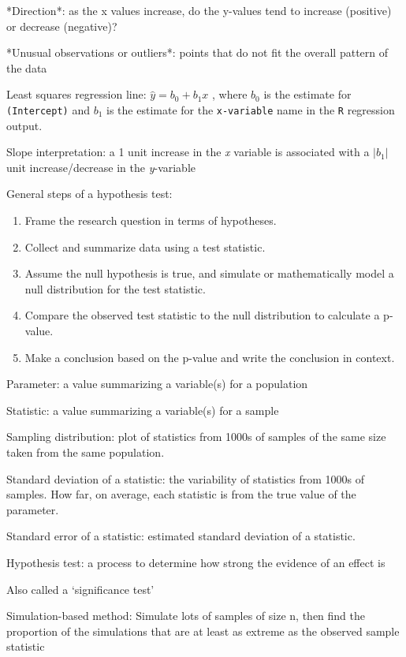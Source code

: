 \documentclass[
]{report}
\newcommand{\rgi}{\hspace{24pt}}  %
\begin{document}
\rgi *Direction*: as the x values increase, do the y-values tend to increase (positive) or decrease (negative)?

\rgi *Unusual observations or outliers*: points that do not fit the overall pattern of the data

Least squares regression line: \(\hat{y} = b_0+b_1x\) , where \(b_0\) is the estimate for \texttt{(Intercept)} and \(b_1\) is the estimate for the \texttt{x-variable} name in the \texttt{R} regression output.

Slope interpretation: a 1 unit increase in the \emph{x} variable is associated with a \(|b_1 |\) unit increase/decrease in the \emph{y}-variable

General steps of a hypothesis test:

\begin{enumerate}
\def\labelenumi{\arabic{enumi}.}
\item
  Frame the research question in terms of hypotheses.
\item
  Collect and summarize data using a test statistic.
\item
  Assume the null hypothesis is true, and simulate or mathematically model a null distribution for the test statistic.
\item
  Compare the observed test statistic to the null distribution to calculate a p-value.
\item
  Make a conclusion based on the p-value and write the conclusion in context.
\end{enumerate}

Parameter: a value summarizing a variable(s) for a population

Statistic: a value summarizing a variable(s) for a sample

Sampling distribution: plot of statistics from 1000s of samples of the same size taken from the same population.

Standard deviation of a statistic: the variability of statistics from 1000s of samples. How far, on average, each statistic is from the true value of the parameter.

Standard error of a statistic: estimated standard deviation of a statistic.

Hypothesis test: a process to determine how strong the evidence of an effect is

\rgi Also called a `significance test'

Simulation-based method: Simulate lots of samples of size n, then find the proportion of the simulations that are at least as extreme as the observed sample statistic
\end{document}
